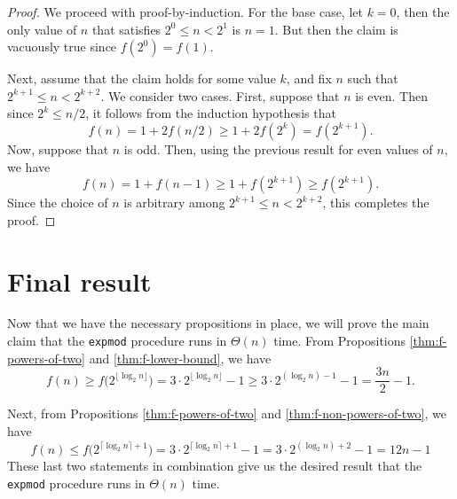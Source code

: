 \documentclass{article}
\begin{document}
\begin{proof}
  We proceed with proof-by-induction.  For the base case, let $k = 0$, then the
  only value of $n$ that satisfies $2^0 \leq n < 2^1$ is $n = 1$.  But then the
  claim is vacuously true since $f(2^0) = f(1)$.

  Next, assume that the claim holds for some value $k$, and fix $n$ such that
  $2^{k + 1} \leq n < 2^{k + 2}$.  We consider two cases.  First, suppose that $n$ is
  even.  Then since $2^k \leq n / 2$, it follows from the induction
  hypothesis that
  \begin{equation*}
    f(n) = 1 + 2 f(n / 2) \geq 1 + 2f(2^k) = f(2^{k + 1}).
  \end{equation*}
  Now, suppose that $n$ is odd.  Then, using the previous result for even values
  of $n$, we have
  \begin{equation*}
    f(n) = 1 + f(n - 1) \geq 1 + f(2^{k + 1}) \geq f(2^{k + 1}).
  \end{equation*}
  Since the choice of $n$ is arbitrary among $2^{k + 1} \leq n < 2^{k + 2}$,
  this completes the proof.
\end{proof}




\section{Final result}

Now that we have the necessary propositions in place, we will prove the main
claim that the \lstinline{expmod} procedure runs in $\Theta(n)$ time.  From
Propositions \ref{thm:f-powers-of-two} and \ref{thm:f-lower-bound}, we have
\begin{equation*}
  f(n)
  \geq f \big(2^{\lfloor \log_2 n \rfloor} \big)
  = 3 \cdot 2^{\lfloor \log_2 n \rfloor} - 1
  \geq 3 \cdot 2^{(\log_2 n ) - 1} - 1
  = \frac{3n}{2} - 1.
\end{equation*}

Next, from Propositions \ref{thm:f-powers-of-two} and
\ref{thm:f-non-powers-of-two}, we have
\begin{equation*}
  f(n)
  \leq f \big(2^{\lceil \log_2 n \rceil + 1} \big)
  = 3 \cdot 2^{\lceil \log_2 n \rceil + 1} - 1
  = 3 \cdot 2^{(\log_2 n ) + 2} - 1
  = 12n - 1
\end{equation*}
These last two statements in combination give us the desired result that the
\lstinline{expmod} procedure runs in $\Theta(n)$ time.
\end{document}
